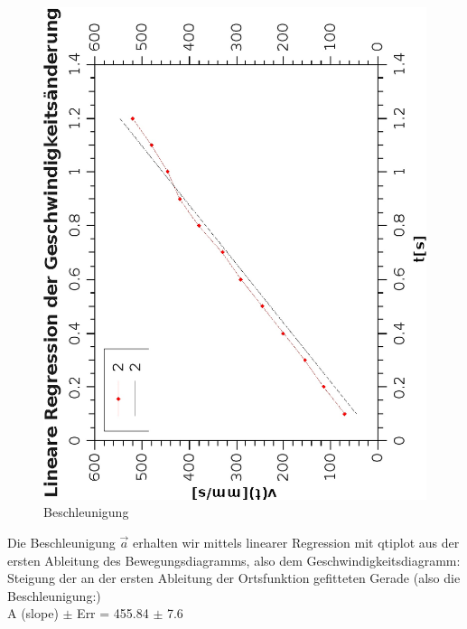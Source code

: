 \documentclass{article}
\begin{document}
\begin{figure}[H]
\caption{Beschleunigung}
\begin{center}
\includegraphics[scale=0.7,angle=-90]{GlmBeschlRegrBeschl.eps}
\end{center}
\end{figure}

Die Beschleunigung $\vec{a}$ erhalten wir mittels linearer Regression mit qtiplot aus der ersten Ableitung des Bewegungsdiagramms, also dem Geschwindigkeitsdiagramm: \\

Steigung der an der ersten Ableitung der Ortsfunktion gefitteten Gerade (also die Beschleunigung:) \\
A (slope) $\pm$ Err = 455.84 $\pm$ 7.6
\end{document}
